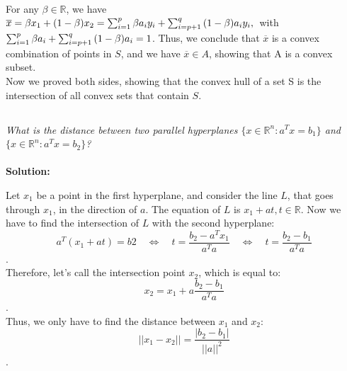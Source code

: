 \documentclass[10pt]{article}
\newcommand{\R}{\mathbb{R}}
\begin{document}
  	 \\
  	 For any $\beta \in \R$, we have \\
  	 \quad $\overline{x} = \beta x_1 + (1 - \beta) x_2  = \sum_{i=1}^{p}{\beta a_i y_i} + \sum_{i=p+1}^{q}{(1-\beta) a_i y_i},\\ $
  	 with $\sum_{i=1}^{p}{\beta a_i } + \sum_{i=p+1}^{q}{(1-\beta) a_i} = 1 \\ $. 
  	 Thus, we conclude that $\overline{x}$ is a convex combination of points in $S$, and we have $\overline{x} \in A$, showing that A is a convex subset. \\
  	 Now we proved both sides, showing that the convex hull  of a set S is the intersection of all convex sets that contain $S$.
  	\newpage
  	
  	
  	\begin{center}
    	\section{}
  	\end{center}\par
  	\textit{What is the distance between two parallel hyperplanes $\{x \in \R^n : a^Tx = b_1 \}$ and
$\{x \in \R^n : a^Tx = b_2 \}$?}\\ \\
  	\textbf{Solution:}\\ \par
  	Let $x_1$ be a point in the first hyperplane, and consider the line $L$, that goes through $x_1$, in the direction of $a$. The equation of $L$ is $x_1+at, t \in \R$. Now we have to find the intersection of $L$ with the second hyperplane: \\
  	$$a^T(x_1+at) = b2 \quad \Leftrightarrow \quad  t = \frac{b_2 - a^Tx_1}{a^Ta} \quad \Leftrightarrow \quad t = \frac{b_2 - b_1}{a^Ta}$$. \\
  	Therefore, let's call the intersection point $x_2$, which is equal to: \\
  	$$x_2 = x_1 + a\frac{b_2 - b_1}{a^Ta}$$. \\
  	Thus, we only have to find the distance between $x_1$ and $x_2$: \\
  	$$||x_1 - x_2|| = \frac{|b_2-b_1|}{||a||^2}$$.
  	\par
 
  	
  	
  	\newpage
  	
  	
\end{document}
